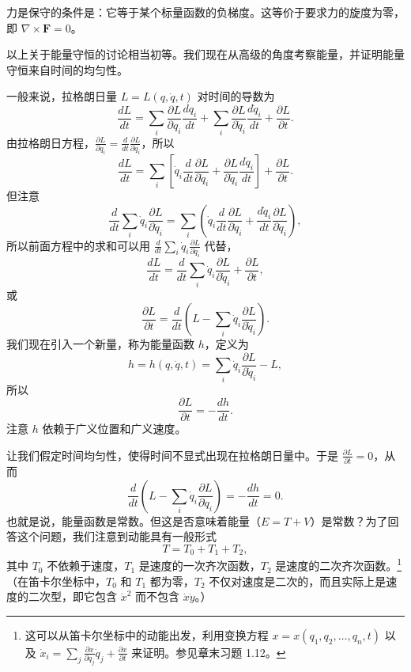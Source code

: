 力是保守的条件是：它等于某个标量函数的负梯度。这等价于要求力的旋度为零，即 $\nabla\times\mathbf{F} = 0$。

以上关于能量守恒的讨论相当初等。我们现在从高级的角度考察能量，并证明能量守恒来自时间的均匀性。

一般来说，拉格朗日量 $L = L(q, \dot{q}, t)$ 对时间的导数为
$$
\frac{dL}{dt} = \sum_i\frac{\partial L}{\partial q_i}\frac{dq_i}{dt} + \sum_i\frac{\partial L}{\partial \dot{q}_i}\frac{d\dot{q}_i}{dt} + \frac{\partial L}{\partial t}.
$$
由拉格朗日方程，$\frac{\partial L}{\partial q_i} = \frac{d}{dt}\frac{\partial L}{\partial \dot{q}_i}$，所以
$$
\frac{dL}{dt} = \sum_i\left[\dot{q}_i\frac{d}{dt}\frac{\partial L}{\partial \dot{q}_i} + \frac{\partial L}{\partial \dot{q}_i}\frac{d\dot{q}_i}{dt}\right] + \frac{\partial L}{\partial t}.
$$
但注意
$$
\frac{d}{dt}\sum_i\dot{q}_i\frac{\partial L}{\partial \dot{q}_i} = \sum_i\left(\dot{q}_i\frac{d}{dt}\frac{\partial L}{\partial \dot{q}_i} + \frac{d\dot{q}_i}{dt}\frac{\partial L}{\partial \dot{q}_i}\right),
$$
所以前面方程中的求和可以用 $\frac{d}{dt}\sum_i\dot{q}_i\frac{\partial L}{\partial \dot{q}_i}$ 代替，
$$
\frac{dL}{dt} = \frac{d}{dt}\sum_i\dot{q}_i\frac{\partial L}{\partial \dot{q}_i} + \frac{\partial L}{\partial t},
$$
或
$$
\frac{\partial L}{\partial t} = \frac{d}{dt}\left(L - \sum_i\dot{q}_i\frac{\partial L}{\partial \dot{q}_i}\right).
$$
我们现在引入一个新量，称为能量函数 $h$，定义为
$$
h = h(q, \dot{q}, t) = \sum_i\dot{q}_i\frac{\partial L}{\partial \dot{q}_i} - L,
$$
所以
$$
\frac{\partial L}{\partial t} = -\frac{dh}{dt}.
$$
注意 $h$ 依赖于广义位置和广义速度。

让我们假定时间均匀性，使得时间不显式出现在拉格朗日量中。于是 $\frac{\partial L}{\partial t} = 0$，从而
$$
\frac{d}{dt}\left(L - \sum_i\dot{q}_i\frac{\partial L}{\partial \dot{q}_i}\right) = -\frac{dh}{dt} = 0.
$$
也就是说，能量函数是常数。但这是否意味着能量（$E = T + V$）是常数？为了回答这个问题，我们注意到动能具有一般形式
$$
T = T_0 + T_1 + T_2,
$$
其中 $T_0$ 不依赖于速度，$T_1$ 是速度的一次齐次函数，$T_2$ 是速度的二次齐次函数。\footnote{这可以从笛卡尔坐标中的动能出发，利用变换方程 $x = x(q_1, q_2, \ldots, q_n, t)$ 以及 $\dot{x}_i = \sum_j\frac{\partial x}{\partial q_j}\dot{q}_j + \frac{\partial x}{\partial t}$ 来证明。参见章末习题 1.12。}（在笛卡尔坐标中，$T_0$ 和 $T_1$ 都为零，$T_2$ 不仅对速度是二次的，而且实际上是速度的二次型，即它包含 $\dot{x}^2$ 而不包含 $\dot{x}\dot{y}$。）


